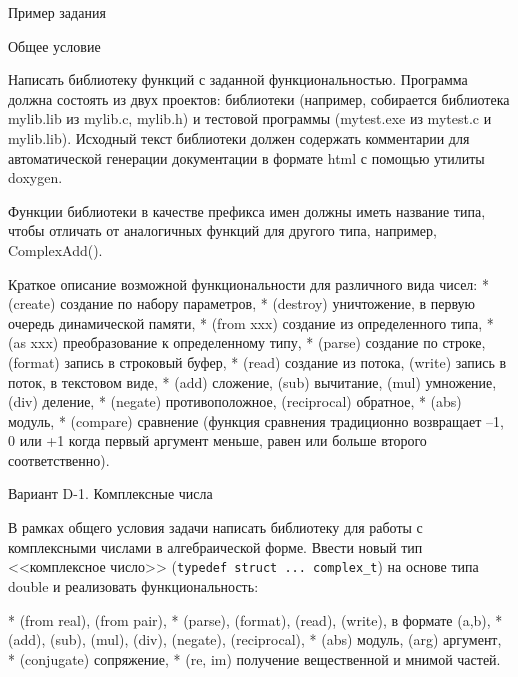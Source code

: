 Пример задания

Общее условие

Написать библиотеку функций с заданной функциональностью. Программа должна
состоять из двух проектов: библиотеки (например, собирается библиотека
mylib.lib из mylib.c, mylib.h) и тестовой программы (mytest.exe из mytest.c и
mylib.lib). Исходный текст библиотеки должен содержать комментарии для
автоматической генерации документации в формате html с помощью утилиты
doxygen.

Функции библиотеки в качестве префикса имен должны иметь название типа, чтобы
отличать от аналогичных функций для другого типа, например, ComplexAdd().

Краткое описание возможной функциональности для различного вида чисел:
* (create) создание по набору параметров,
* (destroy) уничтожение, в первую очередь динамической памяти,
* (from xxx) создание из определенного типа,
* (as xxx) преобразование к определенному типу,
* (parse) создание по строке, (format) запись в строковый буфер,
* (read) создание из потока, (write) запись в поток, в текстовом виде,
* (add) сложение, (sub) вычитание, (mul) умножение, (div) деление,
* (negate) противоположное, (reciprocal) обратное,
* (abs) модуль,
* (compare) сравнение (функция сравнения традиционно возвращает –1, 0 или +1 когда первый аргумент меньше, равен или больше второго соответственно).


Вариант D-1. Комплексные числа

В рамках общего условия задачи написать библиотеку для работы с комплексными
числами в алгебраической форме. Ввести новый тип <<комплексное число>>
(\verb|typedef struct ... complex_t|) на основе типа double и реализовать функциональность:

* (from real), (from pair),
* (parse), (format), (read), (write), в формате (a,b),
* (add), (sub), (mul), (div), (negate), (reciprocal),
* (abs) модуль, (arg) аргумент,
* (conjugate) сопряжение,
* (re, im) получение вещественной и мнимой частей.


